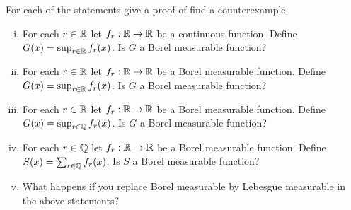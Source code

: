 \begin{problem}
  For each of the statements give a proof of find a counterexample.
  \begin{enumerate}[(i)]
    \item For each $r \in \mathbb R$ let $f_r : \mathbb R \to \mathbb R$ be a continuous function. Define 
    $G(x) = \sup_{r \in \mathbb R} f_r(x)$. Is $G$ a Borel measurable function?
    \item For each $r \in \mathbb R$ let $f_r : \mathbb R \to \mathbb R$ be a Borel measurable function. 
    Define $G(x) = \sup_{r \in \mathbb R} f_r(x)$. Is $G$ a Borel measurable function?
    \item For each $r \in \mathbb R$ let $f_r : \mathbb R \to \mathbb R$ be a Borel measurable function.
    Define $G(x) = \sup_{r \in \mathbb Q} f_r(x)$. Is $G$ a Borel measurable function?
    \item For each $r \in \mathbb Q$ let $f_r : \mathbb R \to \mathbb R$ be a Borel measurable function.
    Define $S(x) = \sum_{r \in \mathbb Q} f_r(x)$. Is $S$ a Borel measurable function?
    \item What happens if you replace Borel measurable by Lebesgue measurable in the above statements?
  \end{enumerate}
\end{problem}

